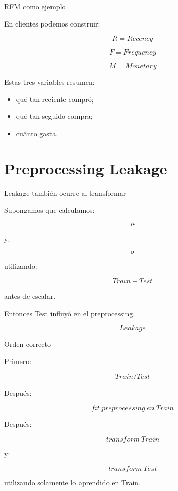 \documentclass[aspectratio=169,11pt]{beamer}
\begin{document}

\begin{frame}{RFM como ejemplo}

En clientes podemos construir:

\[
R
=
Recency
\]

\[
F
=
Frequency
\]

\[
M
=
Monetary
\]

Estas tres variables resumen:

\begin{itemize}

    \item qué tan reciente compró;

    \item qué tan seguido compra;

    \item cuánto gasta.

\end{itemize}

\end{frame}

\section{Preprocessing Leakage}

\begin{frame}{Leakage también ocurre al transformar}

Supongamos que calculamos:

\[
\mu
\]

y:

\[
\sigma
\]

utilizando:

\[
Train+Test
\]

antes de escalar.

\vspace{0.5cm}

Entonces Test influyó en el preprocessing.

\[
\boxed{
Leakage
}
\]

\end{frame}


\begin{frame}{Orden correcto}

Primero:

\[
Train/Test
\]

Después:

\[
fit\ preprocessing\ en\ Train
\]

Después:

\[
transform\ Train
\]

y:

\[
transform\ Test
\]

utilizando solamente lo aprendido en Train.

\end{frame}
\end{document}
